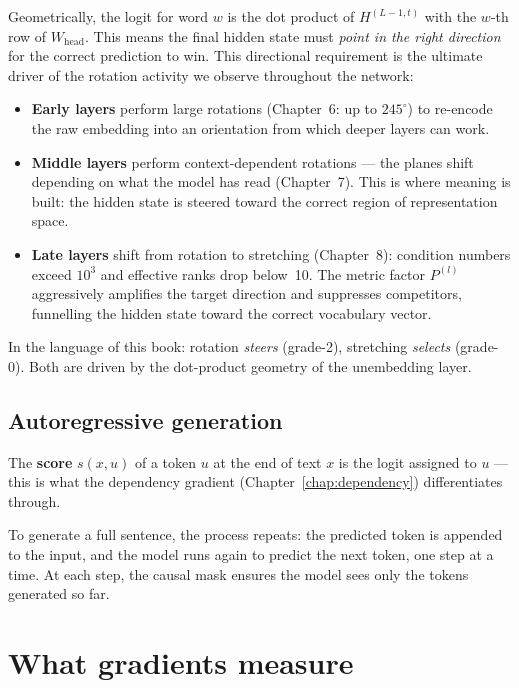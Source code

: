 \documentclass[11pt, twoside, openright]{memoir}
\numberwithin{equation}{chapter}
\begin{document}
Geometrically, the logit for word $w$ is the dot product of
$H^{(L-1,t)}$ with the $w$-th row of $W_{\mathrm{head}}$.  This means
the final hidden state must \emph{point in the right direction} for the
correct prediction to win.  This directional requirement is the
ultimate driver of the rotation activity we observe throughout the
network:

\begin{itemize}[nosep]
\item \textbf{Early layers} perform large rotations (Chapter~6: up to
  $245^\circ$) to re-encode the raw embedding into an orientation from
  which deeper layers can work.
\item \textbf{Middle layers} perform context-dependent rotations --- the
  planes shift depending on what the model has read (Chapter~7).  This
  is where meaning is built: the hidden state is steered toward the
  correct region of representation space.
\item \textbf{Late layers} shift from rotation to stretching
  (Chapter~8): condition numbers exceed $10^3$ and effective ranks drop
  below~10.  The metric factor $P^{(l)}$ aggressively amplifies the
  target direction and suppresses competitors, funnelling the hidden
  state toward the correct vocabulary vector.
\end{itemize}

In the language of this book: rotation \emph{steers} (grade-2),
stretching \emph{selects} (grade-0).  Both are driven by the
dot-product geometry of the unembedding layer.

\subsection*{Autoregressive generation}

The \textbf{score} $s(x, u)$ of a token $u$ at the end of text $x$ is
the logit assigned to $u$ --- this is what the dependency gradient
(Chapter~\ref{chap:dependency}) differentiates through.

To generate a full sentence, the process repeats: the predicted token
is appended to the input, and the model runs again to predict the next
token, one step at a time.  At each step, the causal mask ensures the
model sees only the tokens generated so far.

\section{What gradients measure}
\end{document}
